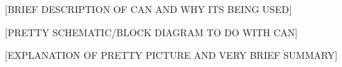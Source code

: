 [BRIEF DESCRIPTION OF CAN AND WHY ITS BEING USED]

[PRETTY SCHEMATIC/BLOCK DIAGRAM TO DO WITH CAN]

[EXPLANATION OF PRETTY PICTURE AND VERY BRIEF SUMMARY]